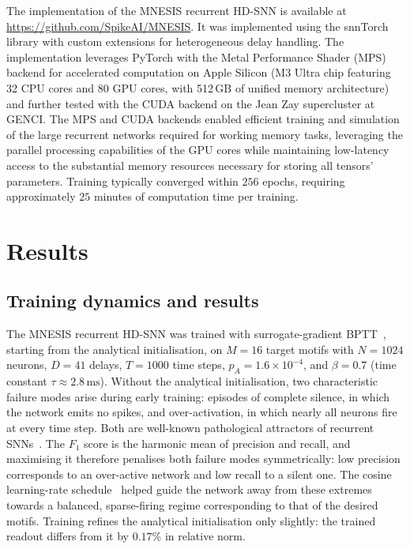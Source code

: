 \documentclass{scrartcl}
\newcommand{\citep}[1]{\parencite{#1}}
\begin{document}
The implementation of the MNESIS recurrent HD-SNN is available at \url{https://github.com/SpikeAI/MNESIS}. It was implemented using the snnTorch~\citep{Eshraghian2023} library with custom extensions for heterogeneous delay handling. The implementation leverages PyTorch with the Metal Performance Shader (MPS) backend for accelerated computation on Apple Silicon (M3 Ultra chip featuring 32 CPU cores and 80 GPU cores, with 512\,GB of unified memory architecture) and further tested with the CUDA backend on the Jean Zay supercluster at GENCI\@. The MPS and CUDA backends enabled efficient training and simulation of the large recurrent networks required for working memory tasks, leveraging the parallel processing capabilities of the GPU cores while maintaining low-latency access to the substantial memory resources necessary for storing all tensors' parameters. Training typically converged within $256$ epochs, requiring approximately $25$ minutes of computation time per training.
%
\section{Results}
\label{sec:results}
\subsection{Training dynamics and results}

%
The MNESIS recurrent HD-SNN was trained with surrogate-gradient BPTT~\citep{Neftci2019a}, starting from the analytical initialisation, on $M=16$ target motifs with $N=1024$ neurons, $D=41$ delays, $T=1000$ time steps, $p_A=1.6\times10^{-4}$, and $\beta=0.7$ (time constant $\tau \approx 2.8\,\mathrm{ms}$). Without the analytical initialisation, two characteristic failure modes arise during early training: episodes of complete silence, in which the network emits no spikes, and over-activation, in which nearly all neurons fire at every time step. Both are well-known pathological attractors of recurrent SNNs~\citep{Izhikevich2006,Voges10jpp}. The $F_1$ score is the harmonic mean of precision and recall, and maximising it therefore penalises both failure modes symmetrically: low precision corresponds to an over-active network and low recall to a silent one. The cosine learning-rate schedule~\citep{Hammouamri2023} helped guide the network away from these extremes towards a balanced, sparse-firing regime corresponding to that of the desired motifs. Training refines the analytical initialisation only slightly: the trained readout differs from it by $0.17\%$ in relative norm.
\end{document}
